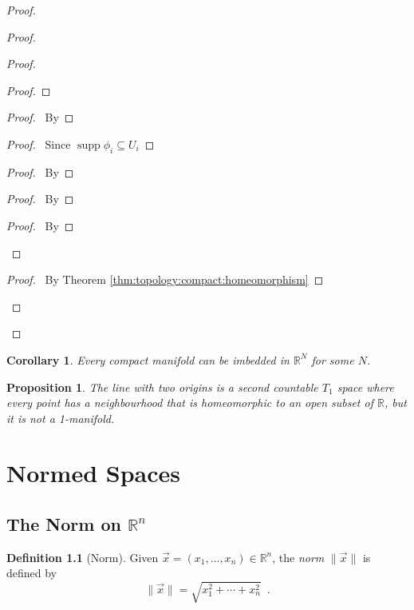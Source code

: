 \documentclass{report}
\let\qed\relax
\newtheorem{prop}[lm]{Proposition}
\newtheorem{cor}{Corollary}[lm]
\theoremstyle{definition}
\newtheorem{df}[lm]{Definition}
\newcommand{\supp}{\ensuremath{\operatorname{supp}}}
\begin{document}
\begin{proof}
\begin{proof}
\begin{proof}
\begin{proof}
    \end{proof}
    \begin{proof}
      \pf\ By 
    \end{proof}
    \begin{proof}
      \pf\ Since $\supp \phi_i \subseteq U_i$
    \end{proof}
    \begin{proof}
      \pf\ By 
    \end{proof}
    \begin{proof}
      \pf\ By 
    \end{proof}
    \begin{proof}
      \pf\ By 
    \end{proof}
  \end{proof}
  \qedstep
  \begin{proof}
    \pf\ By Theorem \ref{thm:topology:compact:homeomorphism}
  \end{proof}
\end{proof}
\qed
 \end{proof}

   \begin{cor}
   Every compact manifold can be imbedded in $\mathbb{R}^N$ for some $N$.
 \end{cor}

 \begin{prop}
  The line with two origins is a second countable $T_1$ space where every point
  has a neighbourhood that is homeomorphic to an open subset of $\mathbb{R}$,
but it is not a 1-manifold.
 \end{prop}

  \chapter{Normed Spaces}

  \section{The Norm on $\mathbb{R}^n$}

  \begin{df}[Norm]
    Given $\vec{x} = (x_1, \ldots, x_n) \in \mathbb{R}^n$, the \emph{norm}
    $\|\vec{x}\|$ is defined by
    \[ \|\vec{x}\| = \sqrt{x_1^2 + \cdots + x_n^2} \enspace . \]
  \end{df}
\end{document}
